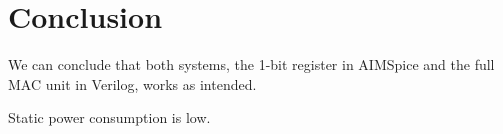 \section{Conclusion}
\label{sec:conclution}

We can conclude that both systems, the 1-bit register in AIMSpice and the full MAC unit in Verilog, works as intended. 

Static power consumption is low. 


